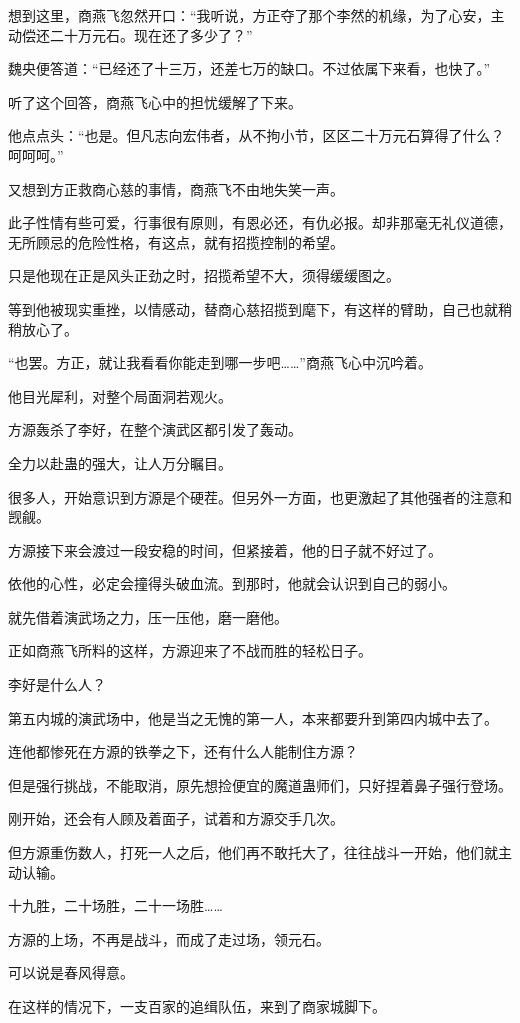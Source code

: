 \begin{this_body}
想到这里，商燕飞忽然开口：“我听说，方正夺了那个李然的机缘，为了心安，主动偿还二十万元石。现在还了多少了？”

魏央便答道：“已经还了十三万，还差七万的缺口。不过依属下来看，也快了。”

听了这个回答，商燕飞心中的担忧缓解了下来。

他点点头：“也是。但凡志向宏伟者，从不拘小节，区区二十万元石算得了什么？呵呵呵。”

又想到方正救商心慈的事情，商燕飞不由地失笑一声。

此子性情有些可爱，行事很有原则，有恩必还，有仇必报。却非那毫无礼仪道德，无所顾忌的危险性格，有这点，就有招揽控制的希望。

只是他现在正是风头正劲之时，招揽希望不大，须得缓缓图之。

等到他被现实重挫，以情感动，替商心慈招揽到麾下，有这样的臂助，自己也就稍稍放心了。

“也罢。方正，就让我看看你能走到哪一步吧……”商燕飞心中沉吟着。

他目光犀利，对整个局面洞若观火。

方源轰杀了李好，在整个演武区都引发了轰动。

全力以赴蛊的强大，让人万分瞩目。

很多人，开始意识到方源是个硬茬。但另外一方面，也更激起了其他强者的注意和觊觎。

方源接下来会渡过一段安稳的时间，但紧接着，他的日子就不好过了。

依他的心性，必定会撞得头破血流。到那时，他就会认识到自己的弱小。

就先借着演武场之力，压一压他，磨一磨他。

正如商燕飞所料的这样，方源迎来了不战而胜的轻松日子。

李好是什么人？

第五内城的演武场中，他是当之无愧的第一人，本来都要升到第四内城中去了。

连他都惨死在方源的铁拳之下，还有什么人能制住方源？

但是强行挑战，不能取消，原先想捡便宜的魔道蛊师们，只好捏着鼻子强行登场。

刚开始，还会有人顾及着面子，试着和方源交手几次。

但方源重伤数人，打死一人之后，他们再不敢托大了，往往战斗一开始，他们就主动认输。

十九胜，二十场胜，二十一场胜……

方源的上场，不再是战斗，而成了走过场，领元石。

可以说是春风得意。

在这样的情况下，一支百家的追缉队伍，来到了商家城脚下。

\end{this_body}

